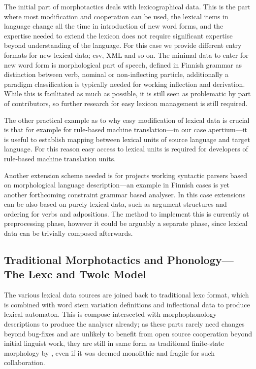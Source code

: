 \documentclass[postprint]{flammie}
\begin{document}
The initial part of morphotactics deals with lexicographical data. This is
the part where most modification and cooperation can be used, the lexical items
in language change all the time in introduction of new word forms, and the
expertise needed to extend the lexicon does not require significant expertise
beyond understanding of the language. For this case we provide different entry
formats for new lexical data; csv, XML and so on. The minimal data to enter for
new word form is morphological part of speech, defined in Finnish grammar
as distinction between verb, nominal or non-inflecting particle, additionally a
paradigm classification is typically needed for working inflection and
derivation. While this is facilitated as much as possible, it is still seen as
problematic by part of contributors, so further research for easy lexicon
management is still required.

The other practical example as to why easy modification of lexical data is
crucial is that for example for rule-based machine translation---in our case
apertium---it is useful to establish mapping between lexical units of source
language and target language. For this reason easy access to lexical units
is required for developers of rule-based machine translation units.

Another extension scheme needed is for projects working syntactic parsers based
on morphological language description---an example in Finnish
cases is yet another forthcoming constraint grammar\cite{karlsson/1990} based
analyser. In this case extensions can be also based on purely lexical data,
such as argument structures and ordering for verbs and adpositions. The method
to implement this is currently at preprocessing phase, however it could be
arguably a separate phase, since lexical data can be trivially composed
afterwards.

\subsection{Traditional Morphotactics and Phonology---The Lexc and Twolc Model}

The various lexical data sources are joined back to traditional lexc format,
which is combined with word stem variation definitions and inflectional data to
produce lexical automaton. This is compose-intersected with morphophonology
descriptions to produce the analyser already; as these parts rarely need
changes beyond bug-fixes and are unlikely to benefit from open source
cooperation beyond initial linguist work, they are still in same form as
traditional finite-state morphology by \cite{beesley/2003}, even if it was
deemed monolithic and fragile for such collaboration.
\end{document}
